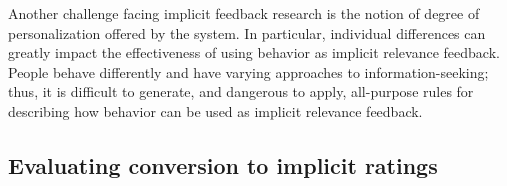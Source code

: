 Another challenge facing implicit feedback research is the notion of degree of
personalization offered by the system. In particular, individual differences
can greatly impact the effectiveness of using behavior as implicit relevance
feedback. People behave differently and have varying approaches to
information-seeking; thus, it is difficult to generate, and dangerous to apply,
all-purpose rules for describing how behavior can be used as implicit relevance
feedback.



\subsection{Evaluating conversion to implicit ratings}

